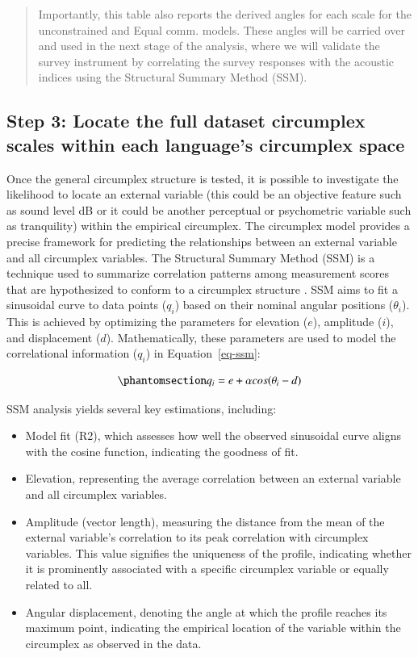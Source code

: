 \documentclass[
  authoryear,
  preprint,
  3p]{elsarticle}
\providecommand{\tightlist}{%
  \setlength{\itemsep}{0pt}\setlength{\parskip}{0pt}}\usepackage{longtable,booktabs,array}
\begin{document}
\begin{quote}
Importantly, this table also reports the derived angles for each scale
for the unconstrained and Equal comm. models. These angles will be
carried over and used in the next stage of the analysis, where we will
validate the survey instrument by correlating the survey responses with
the acoustic indices using the Structural Summary Method (SSM).
\end{quote}

\subsection{Step 3: Locate the full dataset circumplex scales within
each language's circumplex
space}\label{step-3-locate-the-full-dataset-circumplex-scales-within-each-languages-circumplex-space}

Once the general circumplex structure is tested, it is possible to
investigate the likelihood to locate an external variable (this could be
an objective feature such as sound level dB or it could be another
perceptual or psychometric variable such as tranquility) within the
empirical circumplex. The circumplex model provides a precise framework
for predicting the relationships between an external variable and all
circumplex variables. The Structural Summary Method (SSM) is a technique
used to summarize correlation patterns among measurement scores that are
hypothesized to conform to a circumplex structure
\citep{Rogoza2021three}. SSM aims to fit a sinusoidal curve to data
points (\(q_i\)) based on their nominal angular positions
(\(\theta_i\)). This is achieved by optimizing the parameters for
elevation (\(e\)), amplitude (\(i\)), and displacement (\(d\)).
Mathematically, these parameters are used to model the correlational
information (\(q_i\)) in Equation~\ref{eq-ssm}:

\begin{equation}\phantomsection\label{eq-ssm}{
q_i = e + \alpha cos(\theta_i - d)
}\end{equation}

SSM analysis yields several key estimations, including:

\begin{itemize}
\tightlist
\item
  Model fit (R2), which assesses how well the observed sinusoidal curve
  aligns with the cosine function, indicating the goodness of fit.
\item
  Elevation, representing the average correlation between an external
  variable and all circumplex variables.
\item
  Amplitude (vector length), measuring the distance from the mean of the
  external variable's correlation to its peak correlation with
  circumplex variables. This value signifies the uniqueness of the
  profile, indicating whether it is prominently associated with a
  specific circumplex variable or equally related to all.
\item
  Angular displacement, denoting the angle at which the profile reaches
  its maximum point, indicating the empirical location of the variable
  within the circumplex as observed in the data.
\end{itemize}
\end{document}
